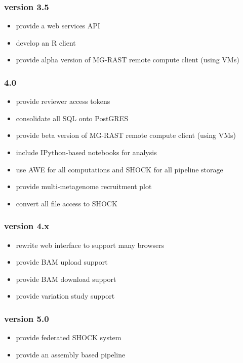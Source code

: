 \documentclass[12pt,fullpage]{report}
\begin{document}
\subsubsection*{version 3.5}
\begin{itemize}
\item provide  a web services API
\item develop an R client
\item provide alpha version of MG-RAST remote compute client (using VMs)
\end{itemize}
\subsubsection*{4.0}
\begin{itemize}
\item provide reviewer access tokens
\item consolidate all SQL onto PostGRES
\item provide beta version of MG-RAST remote compute client (using VMs)
\item include IPython-based notebooks for analysis
\item use AWE for all computations and SHOCK for all pipeline storage
\item provide multi-metagenome recruitment plot
\item convert all file access to SHOCK
\end{itemize}
\subsubsection*{version 4.x}
\begin{itemize}
\item rewrite web interface to support many browsers
\item provide BAM upload support
\item provide BAM download support
\item provide variation study support
\end{itemize}
\subsubsection*{version 5.0}
\begin{itemize}
\item provide federated SHOCK system
\item provide an assembly based pipeline
\end{itemize}
\end{document}
